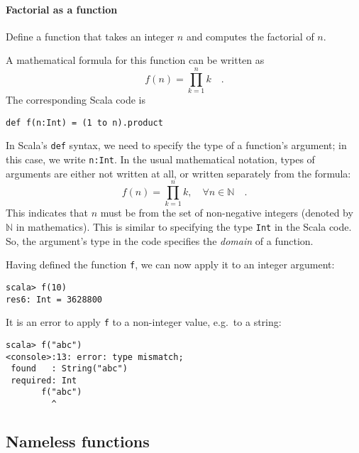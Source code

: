 \paragraph{Factorial as a function}

Define a function that takes an integer $n$ and computes the factorial
of $n$.

A mathematical formula for this function can be written as
\[
f\left(n\right)=\prod_{k=1}^{n}k\quad.
\]
The corresponding Scala code is
\begin{lstlisting}
def f(n:Int) = (1 to n).product
\end{lstlisting}
In Scala's \texttt{}\lstinline!def!
syntax, we need to specify the type of a function's argument; in this
case, we write \lstinline!n:Int!.
In the usual mathematical notation, types of arguments are either
not written at all, or written separately from the formula:
\[
f(n)=\prod_{k=1}^{n}k,\quad\forall n\in\mathbb{N}\quad.
\]
This indicates that $n$ must be from the set of non-negative integers
(denoted by $\mathbb{N}$ in mathematics). This is similar to specifying
the type \texttt{}\lstinline!Int!
in the Scala code. So, the argument's type in the code specifies the
\emph{domain} of a function.

Having defined the function \lstinline!f!,
we can now apply it to an integer argument: 
\begin{lstlisting}
scala> f(10)
res6: Int = 3628800
\end{lstlisting}
It is an error to apply \lstinline!f!
to a non-integer value, e.g.\ to a string:
\begin{lstlisting}
scala> f("abc")
<console>:13: error: type mismatch;
 found   : String("abc")
 required: Int
       f("abc")
         ^ 
\end{lstlisting}

\subsection{Nameless functions\label{subsec:Nameless-functions}}

